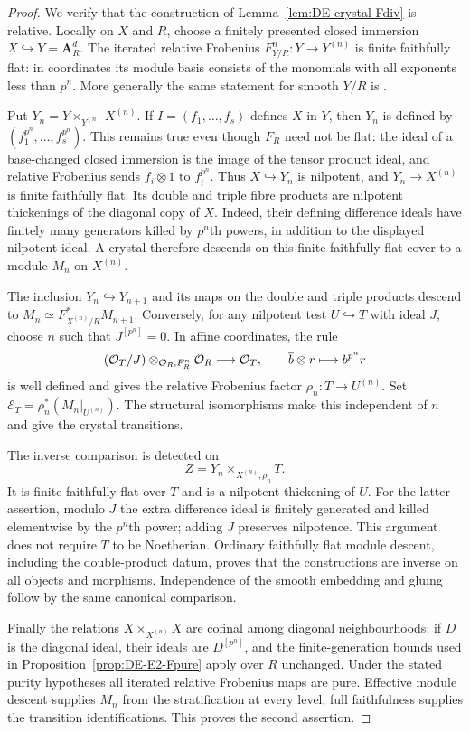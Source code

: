 \begin{proof}
We verify that the construction of Lemma~\ref{lem:DE-crystal-Fdiv} is relative.  Locally on $X$ and $R$, choose a finitely presented closed immersion $X\hookrightarrow Y=\mathbf A_R^d$.  The iterated relative Frobenius $F_{Y/R}^n:Y\to Y^{(n)}$ is finite faithfully flat: in coordinates its module basis consists of the monomials with all exponents less than $p^n$.  More generally the same statement for smooth $Y/R$ is \cite[Lemma~50.19.5, Tag~0FW2]{StacksProject}.

Put $Y_n=Y\times_{Y^{(n)}}X^{(n)}$.  If $I=(f_1,\ldots,f_s)$ defines $X$ in $Y$, then $Y_n$ is defined by $(f_1^{p^n},\ldots,f_s^{p^n})$.  This remains true even though $F_R$ need not be flat: the ideal of a base-changed closed immersion is the image of the tensor product ideal, and relative Frobenius sends $f_i\otimes1$ to $f_i^{p^n}$.  Thus $X\hookrightarrow Y_n$ is nilpotent, and $Y_n\to X^{(n)}$ is finite faithfully flat.  Its double and triple fibre products are nilpotent thickenings of the diagonal copy of $X$.  Indeed, their defining difference ideals have finitely many generators killed by $p^n$th powers, in addition to the displayed nilpotent ideal.  A crystal therefore descends on this finite faithfully flat cover to a module $M_n$ on $X^{(n)}$.

The inclusion $Y_n\hookrightarrow Y_{n+1}$ and its maps on the double and triple products descend to $M_n\simeq F_{X^{(n)}/R}^*M_{n+1}$.  Conversely, for any nilpotent test $U\hookrightarrow T$ with ideal $J$, choose $n$ such that $J^{[p^n]}=0$.  In affine coordinates, the rule
\[
 (\mathcal O_T/J)\otimes_{\mathcal O_R,F_R^n}\mathcal O_R
        \longrightarrow\mathcal O_T,
       \qquad \overline b\otimes r\longmapsto b^{p^n}r
\]
is well defined and gives the relative Frobenius factor $\rho_n:T\to U^{(n)}$.  Set $\mathcal E_T=\rho_n^*(M_n|_{U^{(n)}})$.  The structural isomorphisms make this independent of $n$ and give the crystal transitions.

The inverse comparison is detected on
\[
                 Z=Y_n\times_{X^{(n)},\rho_n}T.
\]
It is finite faithfully flat over $T$ and is a nilpotent thickening of $U$.  For the latter assertion, modulo $J$ the extra difference ideal is finitely generated and killed elementwise by the $p^n$th power; adding $J$ preserves nilpotence.  This argument does not require $T$ to be Noetherian.  Ordinary faithfully flat module descent, including the double-product datum, proves that the constructions are inverse on all objects and morphisms.  Independence of the smooth embedding and gluing follow by the same canonical comparison.

Finally the relations $X\times_{X^{(n)}}X$ are cofinal among diagonal neighbourhoods: if $D$ is the diagonal ideal, their ideals are $D^{[p^n]}$, and the finite-generation bounds used in Proposition~\ref{prop:DE-E2-Fpure} apply over $R$ unchanged.  Under the stated purity hypotheses all iterated relative Frobenius maps are pure.  Effective module descent \cite[Theorem~35.4.22, Tag~08WE]{StacksProject} supplies $M_n$ from the stratification at every level; full faithfulness supplies the transition identifications.  This proves the second assertion.
\end{proof}

